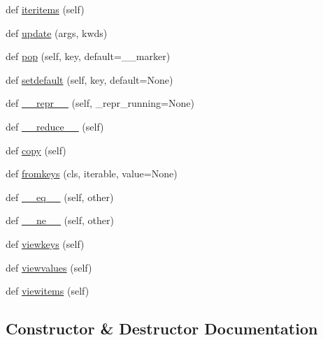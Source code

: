 \begin{DoxyCompactItemize}
def \hyperlink{classpip_1_1__vendor_1_1distlib_1_1compat_1_1OrderedDict_a3d627da27acea3538e9861ee670fc289}{iteritems} (self)
\item 
def \hyperlink{classpip_1_1__vendor_1_1distlib_1_1compat_1_1OrderedDict_abb2b763f31fcd25dd752273b1ec0eb1c}{update} (args, kwds)
\item 
def \hyperlink{classpip_1_1__vendor_1_1distlib_1_1compat_1_1OrderedDict_ae316e3827116112c73a1817614580875}{pop} (self, key, default=\+\_\+\+\_\+marker)
\item 
def \hyperlink{classpip_1_1__vendor_1_1distlib_1_1compat_1_1OrderedDict_a749fff32343d384a943033c99b8d65e0}{setdefault} (self, key, default=None)
\item 
def \hyperlink{classpip_1_1__vendor_1_1distlib_1_1compat_1_1OrderedDict_a3d8fa2b948e3414bed2276fa727286a8}{\+\_\+\+\_\+repr\+\_\+\+\_\+} (self, \+\_\+repr\+\_\+running=None)
\item 
def \hyperlink{classpip_1_1__vendor_1_1distlib_1_1compat_1_1OrderedDict_adcb7664d5ac92fd390c3b366fc7c3015}{\+\_\+\+\_\+reduce\+\_\+\+\_\+} (self)
\item 
def \hyperlink{classpip_1_1__vendor_1_1distlib_1_1compat_1_1OrderedDict_aeb6f65561b7f0b7502e895d21754dc87}{copy} (self)
\item 
def \hyperlink{classpip_1_1__vendor_1_1distlib_1_1compat_1_1OrderedDict_a36d1485fc427e321a71c0fee4257414e}{fromkeys} (cls, iterable, value=None)
\item 
def \hyperlink{classpip_1_1__vendor_1_1distlib_1_1compat_1_1OrderedDict_ae3489e81a223351378c9a41f93136439}{\+\_\+\+\_\+eq\+\_\+\+\_\+} (self, other)
\item 
def \hyperlink{classpip_1_1__vendor_1_1distlib_1_1compat_1_1OrderedDict_a8930d9751417e1bd02ae6b488e101250}{\+\_\+\+\_\+ne\+\_\+\+\_\+} (self, other)
\item 
def \hyperlink{classpip_1_1__vendor_1_1distlib_1_1compat_1_1OrderedDict_a7f506e75f42b107f91c110d401b639b1}{viewkeys} (self)
\item 
def \hyperlink{classpip_1_1__vendor_1_1distlib_1_1compat_1_1OrderedDict_a3ef3ae6f092c0239fb19b4eca4a2175a}{viewvalues} (self)
\item 
def \hyperlink{classpip_1_1__vendor_1_1distlib_1_1compat_1_1OrderedDict_a26e3c313a33f200f0a46e790221f9b8b}{viewitems} (self)
\end{DoxyCompactItemize}


\subsection{Constructor \& Destructor Documentation}
\mbox{\label{classpip_1_1__vendor_1_1distlib_1_1compat_1_1OrderedDict_a0b3f11702cdd50f0a81036f48bcdf9a4}} 
